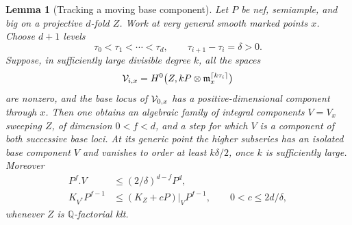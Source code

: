 \documentclass[11pt,letterpaper]{article}
\newcommand{\Q}{\mathbb{Q}}
\newtheorem{lemma}[theorem]{Lemma}
\theoremstyle{definition}
\theoremstyle{remark}
\begin{document}
\begin{lemma}[Tracking a moving base component]\label{proj:jet:tracking}
Let \(P\) be nef, semiample, and big on a projective \(d\)-fold \(Z\).
Work at very general smooth marked points \(x\).  Choose \(d+1\)
levels
\[
 \tau_0<\tau_1<\cdots<\tau_d,\qquad
 \tau_{i+1}-\tau_i=\delta>0.
\]
Suppose, in sufficiently large divisible degree \(k\), all the spaces
\[
 {\cal V}_{i,x}
 =H^0\bigl(Z,kP\otimes\mathfrak m_x^{\lceil k\tau_i\rceil}\bigr)
\]
are nonzero, and the base locus of \({\cal V}_{0,x}\) has a
positive-dimensional component through \(x\).
Then one obtains an algebraic family of integral components \(V=V_x\)
sweeping \(Z\), of dimension \(0<f<d\), and a step for which \(V\)
is a component of both successive base loci.  At its generic point
the higher subseries has an isolated base component \(V\) and
vanishes to order at least \(k\delta/2\), once \(k\) is sufficiently
large.  Moreover
\begin{equation}\label{proj:jet:tracking-estimates}
 \begin{split}
  P^f.V&\le (2/\delta)^{d-f}P^d,\\
  K_{V^*}P^{f-1}
   &\le (K_Z+cP)|_V P^{f-1},
       \qquad 0<c\le 2d/\delta,
 \end{split}
\end{equation}
whenever \(Z\) is \(\Q\)-factorial klt.
\end{lemma}
\end{document}
